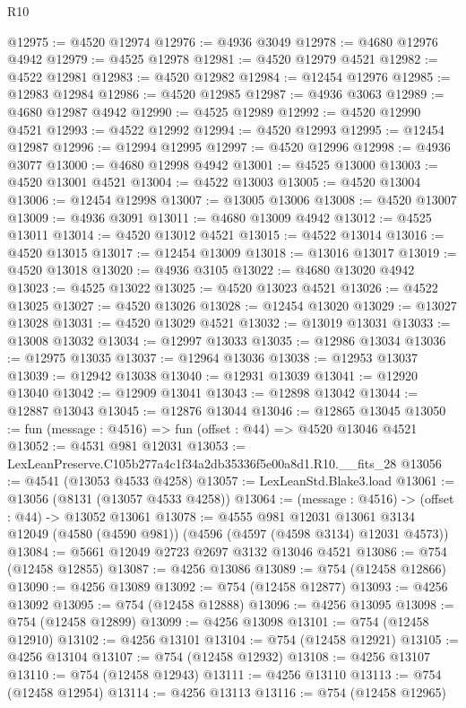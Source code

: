 \begin{lexlean}{R10}
\begin{coremodule}
@12975 := @4520 @12974
@12976 := @4936 @3049
@12978 := @4680 @12976 @4942
@12979 := @4525 @12978
@12981 := @4520 @12979 @4521
@12982 := @4522 @12981
@12983 := @4520 @12982
@12984 := @12454 @12976
@12985 := @12983 @12984
@12986 := @4520 @12985
@12987 := @4936 @3063
@12989 := @4680 @12987 @4942
@12990 := @4525 @12989
@12992 := @4520 @12990 @4521
@12993 := @4522 @12992
@12994 := @4520 @12993
@12995 := @12454 @12987
@12996 := @12994 @12995
@12997 := @4520 @12996
@12998 := @4936 @3077
@13000 := @4680 @12998 @4942
@13001 := @4525 @13000
@13003 := @4520 @13001 @4521
@13004 := @4522 @13003
@13005 := @4520 @13004
@13006 := @12454 @12998
@13007 := @13005 @13006
@13008 := @4520 @13007
@13009 := @4936 @3091
@13011 := @4680 @13009 @4942
@13012 := @4525 @13011
@13014 := @4520 @13012 @4521
@13015 := @4522 @13014
@13016 := @4520 @13015
@13017 := @12454 @13009
@13018 := @13016 @13017
@13019 := @4520 @13018
@13020 := @4936 @3105
@13022 := @4680 @13020 @4942
@13023 := @4525 @13022
@13025 := @4520 @13023 @4521
@13026 := @4522 @13025
@13027 := @4520 @13026
@13028 := @12454 @13020
@13029 := @13027 @13028
@13031 := @4520 @13029 @4521
@13032 := @13019 @13031
@13033 := @13008 @13032
@13034 := @12997 @13033
@13035 := @12986 @13034
@13036 := @12975 @13035
@13037 := @12964 @13036
@13038 := @12953 @13037
@13039 := @12942 @13038
@13040 := @12931 @13039
@13041 := @12920 @13040
@13042 := @12909 @13041
@13043 := @12898 @13042
@13044 := @12887 @13043
@13045 := @12876 @13044
@13046 := @12865 @13045
@13050 := fun (message : @4516) => fun (offset : @44) => @4520 @13046 @4521
@13052 := @4531 @981 @12031
@13053 := LexLeanPreserve.C105b277a4c1f34a2db35336f5e00a8d1.R10.__fits_28
@13056 := @4541 (@13053 @4533 @4258)
@13057 := LexLeanStd.Blake3.load
@13061 := @13056 (@8131 (@13057 @4533 @4258))
@13064 := (message : @4516) -> (offset : @44) -> @13052 @13061
@13078 := @4555
    @981
    @12031
    @13061
    @3134
    @12049
    (@4580 (@4590 @981))
    (@4596 (@4597 (@4598 @3134) @12031 @4573))
@13084 := @5661 @12049 @2723 @2697 @3132 @13046 @4521
@13086 := @754 (@12458 @12855)
@13087 := @4256 @13086
@13089 := @754 (@12458 @12866)
@13090 := @4256 @13089
@13092 := @754 (@12458 @12877)
@13093 := @4256 @13092
@13095 := @754 (@12458 @12888)
@13096 := @4256 @13095
@13098 := @754 (@12458 @12899)
@13099 := @4256 @13098
@13101 := @754 (@12458 @12910)
@13102 := @4256 @13101
@13104 := @754 (@12458 @12921)
@13105 := @4256 @13104
@13107 := @754 (@12458 @12932)
@13108 := @4256 @13107
@13110 := @754 (@12458 @12943)
@13111 := @4256 @13110
@13113 := @754 (@12458 @12954)
@13114 := @4256 @13113
@13116 := @754 (@12458 @12965)

\end{coremodule}
\end{lexlean}
